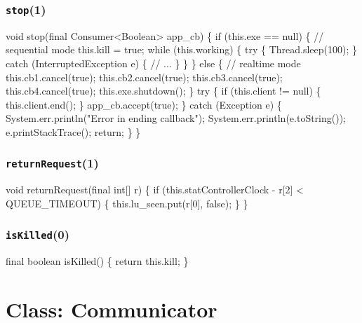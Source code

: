 \subsection{\texttt{stop}(1)}
\nwenddocs{}\endmoddef{}
void stop(final Consumer<Boolean> app_cb) \{
  if (this.exe == null) \{  // sequential mode
    this.kill = true;
    while (this.working) \{
      try \{
        Thread.sleep(100);
      \} catch (InterruptedException e) \{
        // ...
      \}
    \}
  \} else \{  // realtime mode
    this.cb1.cancel(true);
    this.cb2.cancel(true);
    this.cb3.cancel(true);
    this.cb4.cancel(true);
    this.exe.shutdown();
  \}
  try \{
    if (this.client != null) \{
      this.client.end();
    \}
    app_cb.accept(true);
  \} catch (Exception e) \{
    System.err.println("Error in ending callback");
    System.err.println(e.toString());
    e.printStackTrace();
    return;
  \}
\}
\eatline
{}\nwendcode{}\nwdocspar
\subsection{\texttt{returnRequest}(1)}
\nwenddocs{}\endmoddef{}
void returnRequest(final int[] r) \{
  if (this.statControllerClock - r[2] < QUEUE_TIMEOUT) \{
    this.lu_seen.put(r[0], false);
  \}
\}
\eatline
{}\nwendcode{}\nwdocspar
\subsection{\texttt{isKilled}(0)}
\nwenddocs{}\endmoddef{}
final boolean isKilled() \{
  return this.kill;
\}
\eatline
{}\nwendcode{}\nwdocspar
\nwenddocs{}\chapter{Class: Communicator}
\label{communicator}

